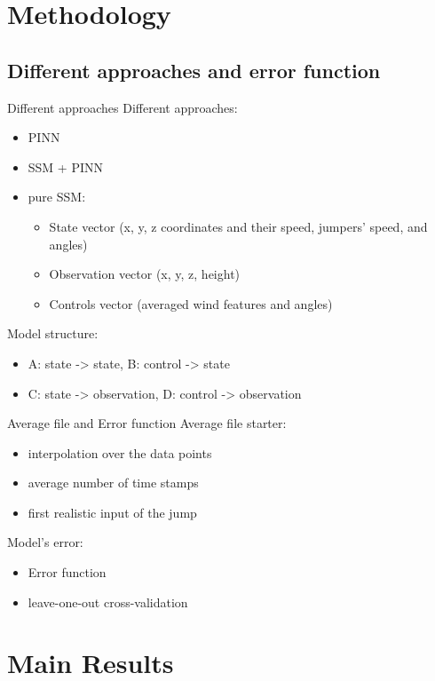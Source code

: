 \documentclass{beamer}
\begin{document}
\section{Methodology}

\subsection{Different approaches and error function}

\begin{frame}{Different approaches}
  Different approaches:
  \begin{itemize}
    \item PINN
    \item SSM + PINN
    \item pure SSM:
    \begin{itemize}
      \item State vector (x, y, z coordinates and their speed, jumpers' speed, and angles)
      \item Observation vector (x, y, z, height)
      \item Controls vector (averaged wind features and angles)
    \end{itemize}
  \end{itemize}
  Model structure:
  \begin{itemize}
    \item A: state -> state, B: control -> state
    \item C: state -> observation, D: control -> observation
  \end{itemize}
\end{frame}


\begin{frame}{Average file and Error function}
  Average file starter:
  \begin{itemize}
    \item interpolation over the data points 
    \item average number of time stamps
    \item first realistic input of the jump
  \end{itemize}
  Model's error:
  \begin{itemize}
    \item Error function
    \item leave-one-out cross-validation
  \end{itemize}
\end{frame}

\section{Main Results}
\end{document}
